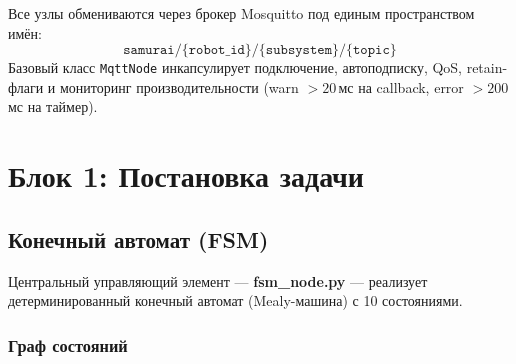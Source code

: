 \documentclass[12pt, a4paper]{article}
\begin{document}
Все узлы обмениваются через брокер Mosquitto под единым пространством имён:
\[
  \texttt{samurai/\{robot\_id\}/\{subsystem\}/\{topic\}}
\]
Базовый класс \texttt{MqttNode} инкапсулирует подключение, автоподписку, QoS, retain-флаги и мониторинг производительности (warn $>20$\,мс на callback, error $>200$\,мс на таймер).

\newpage
\section{Блок 1: Постановка задачи}
\label{sec:task}

\subsection{Конечный автомат (FSM)}
\label{sec:fsm}

Центральный управляющий элемент — \textbf{fsm\_node.py} — реализует детерминированный конечный автомат (Mealy-машина) с 10 состояниями.

\subsubsection{Граф состояний}
\end{document}
